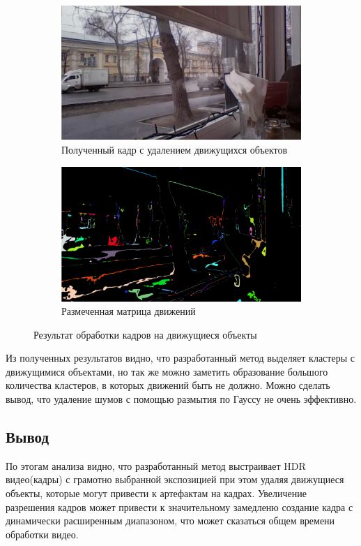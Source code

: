 \begin{figure}[!tbp]
  \centering
  \begin{subfigure}{.5\textwidth}
    \includegraphics[width=\textwidth]{img/hdr_street_hd.png}
    \caption{ Полученный кадр с удалением движущихся объектов}
    \label{fig:hdr_street_deghost}
  \end{subfigure}
  \begin{subfigure}{.5\textwidth}
    \includegraphics[width=\textwidth]{img/motionmap_street_hdr.png}
    \caption{ Размеченная матрица движений}
    \label{fig:street_movemap}
  \end{subfigure}
  \caption { Результат обработки кадров на движущиеся объекты}
  \label{fig:hdr_street_hd}
\end{figure}

Из полученных результатов видно, что разработанный метод выделяет кластеры с движущимися объектами, но так же можно заметить образование большого количества кластеров, в которых движений быть не должно. Можно сделать вывод, что удаление шумов с помощью размытия по Гауссу не очень эффективно.

\subsection{ Вывод}

По этогам анализа видно, что разработанный метод выстраивает HDR видео(кадры) с грамотно выбранной экспозицией при этом удаляя движущиеся объекты, которые могут привести к артефактам на кадрах. Увеличение разрешения кадров может привести к значительному замедленю создание кадра с динамически расширенным диапазоном, что может сказаться общем времени обработки видео.
